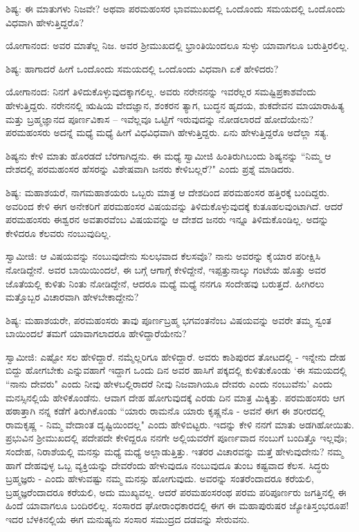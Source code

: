 ಶಿಷ್ಯ: ಈ ಮಾತುಗಳು ನಿಜವೇ? ಅಥವಾ ಪರಮಹಂಸರ ಭಾವಮುಖದಲ್ಲಿ ಒಂದೊಂದು ಸಮಯದಲ್ಲಿ ಒಂದೊಂದು ವಿಧವಾಗಿ ಹೇಳುತ್ತಿದ್ದರೊ?

ಯೋಗಾನಂದ: ಅವರ ಮಾತೆಲ್ಲ ನಿಜ. ಅವರ ಶ‍್ರೀಮುಖದಲ್ಲಿ ಭ್ರಾಂತಿಯಿಂದಲೂ ಸುಳ್ಳು ಯಾವಾಗಲೂ ಬರುತ್ತಿರಲಿಲ್ಲ.

ಶಿಷ್ಯ: ಹಾಗಾದರೆ ಹೀಗೆ ಒಂದೊಂದು ಸಮಯದಲ್ಲಿ ಒಂದೊಂದು ವಿಧವಾಗಿ ಏಕೆ ಹೇಳಿದರು?

ಯೋಗಾನಂದ: ನಿನಗೆ ತಿಳಿದುಕೊಳ್ಳುವುದಕ್ಕಾಗಲಿಲ್ಲ. ಅವರು ನರೇನನನ್ನು ಇವರೆಲ್ಲರ ಸಮಷ್ಟಿಪ್ರಕಾಶವೆಂದು ಹೇಳುತ್ತಿದ್ದರು. ನರೇನನಲ್ಲಿ ಋಷಿಯ ವೇದಜ್ಞಾನ, ಶಂಕರನ ತ್ಯಾಗ, ಬುದ್ಧನ ಹೃದಯ, ಶುಕದೇವನ ಮಾಯಾರಾಹಿತ್ಯ ಮತ್ತು ಬ್ರಹ್ಮಜ್ಞಾನದ ಪೂರ್ಣವಿಕಾಸ – ಇವೆಲ್ಲವೂ ಒಟ್ಟಿಗೆ ಇರುವುದನ್ನು ನೋಡಲಾರದೆ ಹೋದೆಯೇನು? ಪರಮಹಂಸರು ಅದನ್ನೆ ಮಧ್ಯೆ ಮಧ್ಯೆ ಹೀಗೆ ವಿಧವಿಧವಾಗಿ ಹೇಳುತ್ತಿದ್ದರು. ಏನು ಹೇಳುತ್ತಿದ್ದರೊ ಅದೆಲ್ಲಾ ಸತ್ಯ.

ಶಿಷ್ಯನು ಕೇಳಿ ಮಾತು ಹೊರಡದೆ ಬೆರಗಾಗಿದ್ದನು. ಈ ಮಧ್ಯೆ ಸ್ವಾಮೀಜಿ ಹಿಂತಿರುಗಿಬಂದು ಶಿಷ್ಯನನ್ನು “ನಿಮ್ಮ ಆ ದೇಶದಲ್ಲಿ ಪರಮಹಂಸರ ಹೆಸರನ್ನು ವಿಶೇಷವಾಗಿ ಜನರು ಕೇಳಿಬಲ್ಲರೆ?" ಎಂದು ಪ್ರಶ್ನೆ ಮಾಡಿದರು.

ಶಿಷ್ಯ: ಮಹಾಶಯರೆ, ನಾಗಮಹಾಶಯರು ಒಬ್ಬರು ಮಾತ್ರ ಆ ದೇಶದಿಂದ ಪರಮಹಂಸರ ಹತ್ತಿರಕ್ಕೆ ಬಂದಿದ್ದರು. ಅವರಿಂದ ಕೇಳಿ ಈಗ ಅನೇಕರಿಗೆ ಪರಮಹಂಸರ ವಿಷಯವನ್ನು ತಿಳಿದುಕೊಳ್ಳುವುದಕ್ಕೆ ಕುತೂಹಲವುಂಟಾಗಿದೆ. ಆದರೆ ಪರಮಹಂಸರು ಈಶ್ವರನ ಅವತಾರವೆಂಬ ವಿಷಯವನ್ನು ಆ ದೇಶದ ಜನರು ಇನ್ನೂ ತಿಳಿದುಕೊಂಡಿಲ್ಲ. ಅದನ್ನು ಕೇಳಿದರೂ ಕೆಲವರು ನಂಬುವುದಿಲ್ಲ.

ಸ್ವಾಮೀಜಿ: ಆ ವಿಷಯವನ್ನು ನಂಬುವುದೇನು ಸುಲಭವಾದ ಕೆಲಸವೊ? ನಾನು ಅವರನ್ನು ಕೈಯಾರ ಪರೀಕ್ಷಿಸಿ ನೋಡಿದ್ದೇನೆ. ಅವರ ಬಾಯಿಯಿಂದಲೆ, ಈ ಬಗ್ಗೆ ಆಗಾಗ್ಗೆ ಕೇಳಿದ್ದೇನೆ, ಇಪ್ಪತ್ತುನಾಲ್ಕು ಗಂಟೆಯ ಹೊತ್ತು ಅವರ ಜೊತೆಯಲ್ಲಿ ಕುಳಿತು ನಿಂತು ನೋಡಿದ್ದೇನೆ, ಆದರೂ ಮಧ್ಯೆ ಮಧ್ಯೆ ನನಗೂ ಸಂದೇಹವು ಬರುತ್ತದೆ. ಹೀಗಿರಲು ಮತ್ತೊಬ್ಬರ ವಿಚಾರವಾಗಿ ಹೇಳಬೇಕಾದ್ದೇನು?

ಶಿಷ್ಯ: ಮಹಾಶಯರೇ, ಪರಮಹಂಸರು ತಾವು ಪೂರ್ಣಬ್ರಹ್ಮ ಭಗವಂತನೆಂಬ ವಿಷಯವನ್ನು ಅವರೇ ತಮ್ಮ ಸ್ವಂತ ಬಾಯಿಂದಲೆ ತಮಗೆ ಯಾವಾಗಲಾದರೂ ಹೇಳಿದ್ದಾರೆಯೇನು?

ಸ್ವಾಮೀಜಿ: ಎಷ್ಟೋ ಸಲ ಹೇಳಿದ್ದಾರೆ. ನಮ್ಮೆಲ್ಲರಿಗೂ ಹೇಳಿದ್ದಾರೆ. ಅವರು ಕಾಶಿಪುರದ ತೋಟದಲ್ಲಿ - ಇನ್ನೇನು ದೇಹ ಬಿದ್ದು ಹೋಗಬೇಕು ಎನ್ನುವಹಾಗೆ ಇದ್ದಾಗ ಒಂದು ದಿನ ಅವರ ಹಾಸಿಗೆ ಪಕ್ಕದಲ್ಲಿ ಕುಳಿತುಕೊಂಡು ‘ಈ ಸಮಯದಲ್ಲಿ “ನಾನು ದೇವರು" ಎಂದು ನೀವು ಹೇಳಬಲ್ಲಿರಾದರೆ ನೀವು ನಿಜವಾಗಿಯೂ ದೇವರು ಎಂದು ನಂಬುವೆನು’ ಎಂದು ಮನಸ್ಸಿನಲ್ಲಿಯೆ ಹೇಳಿಕೊಂಡೆನು. ಆವಾಗ ದೇಹ ಹೋಗುವುದಕ್ಕೆ ಎರಡು ದಿನ ಮಾತ್ರ ಮಿಕ್ಕಿತ್ತು. ಪರಮಹಂಸರು ಆಗ ಹಠಾತ್ತಾಗಿ ನನ್ನ ಕಡೆಗೆ ತಿರುಗಿಕೊಂಡು “ಯಾರು ರಾಮನೊ ಯಾರು ಕೃಷ್ಣನೊ - ಅವನೆ ಈಗ ಈ ಶರೀರದಲ್ಲಿ ರಾಮಕೃಷ್ಣ - ನಿಮ್ಮ ವೇದಾಂತ ದೃಷ್ಟಿಯಿಂದಲ್ಲ" ಎಂದು ಹೇಳಿಬಿಟ್ಟರು. ಇದನ್ನು ಕೇಳಿ ನನಗೆ ಮಾತು ಅಡಗಿಹೋಯಿತು. ಪ್ರಭುವಿನ ಶ‍್ರೀಮುಖದಲ್ಲಿ ಪದೇಪದೇ ಕೇಳಿದ್ದರೂ ನನಗೇ ಅಲ್ಲಿಯವರೆಗೆ ಪೂರ್ಣವಾದ ನಂಬುಗೆ ಬಂದಿತ್ತೊ ಇಲ್ಲವೊ; ಸಂದೇಹ, ನಿರಾಶೆಯಲ್ಲಿ ಮನಸ್ಸು ಮಧ್ಯೆ ಮಧ್ಯೆ ಅಲ್ಲಾಡುತ್ತಿತ್ತು. ಇತರರ ವಿಚಾರವನ್ನು ಮತ್ತೆ ಹೇಳುವುದೇನು? ನಮ್ಮ ಹಾಗೆ ದೇಹವುಳ್ಳ ಒಬ್ಬ ವ್ಯಕ್ತಿಯನ್ನು ದೇವರೆಂದು ಹೇಳುವುದೂ ನಂಬುವುದೂ ತುಂಬ ಕಷ್ಟವಾದ ಕೆಲಸ. ಸಿದ್ಧರು ಬ್ರಹ್ಮಜ್ಞರು - ಎಂದು ಹೇಳುವಷ್ಟು ನಮ್ಮ ಮನಸ್ಸು ಹೋಗುವುದು. ಅವರನ್ನು ಸಂತರೆಂದಾದರೂ ಕರೆಯಲಿ, ಬ್ರಹ್ಮಜ್ಞರೆಂದಾದರೂ ಕರೆಯಲಿ, ಅದು ಮುಖ್ಯವಲ್ಲ. ಆದರೆ ಪರಮಹಂಸರಂಥ ಪರಮ ಪರಿಪೂರ್ಣರು ಜಗತ್ತಿನಲ್ಲಿ ಈ ಹಿಂದೆ ಯಾವಾಗಲೂ ಬಂದಿರಲಿಲ್ಲ. ಸಂಸಾರದ ಘೋರಾಂಧಕಾರದಲ್ಲಿ ಈಗ ಈ ಮಹಾಪುರುಷರ ಜ್ಯೋತಿಸ್ತಂಭರೂಪ! ಇದರ ಬೆಳಕಿನಲ್ಲಿಯೆ ಈಗ ಮನುಷ್ಯನು ಸಂಸಾರ ಸಮುದ್ರದ ದಡವನ್ನು ಸೇರುವನು.

